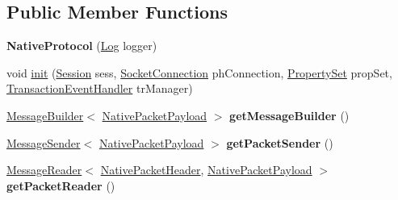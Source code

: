 \subsection*{Public Member Functions}
\begin{DoxyCompactItemize}
\item 
\mbox{\label{classcom_1_1mysql_1_1cj_1_1protocol_1_1a_1_1_native_protocol_ae0847faf5ec07f6c29d29f3f26728b90}} 
{\bfseries Native\+Protocol} (\mbox{\hyperlink{interfacecom_1_1mysql_1_1cj_1_1log_1_1_log}{Log}} logger)
\item 
void \mbox{\hyperlink{classcom_1_1mysql_1_1cj_1_1protocol_1_1a_1_1_native_protocol_a78d72401af5414a2271b9f1012b8a2f9}{init}} (\mbox{\hyperlink{interfacecom_1_1mysql_1_1cj_1_1_session}{Session}} sess, \mbox{\hyperlink{interfacecom_1_1mysql_1_1cj_1_1protocol_1_1_socket_connection}{Socket\+Connection}} ph\+Connection, \mbox{\hyperlink{interfacecom_1_1mysql_1_1cj_1_1conf_1_1_property_set}{Property\+Set}} prop\+Set, \mbox{\hyperlink{interfacecom_1_1mysql_1_1cj_1_1_transaction_event_handler}{Transaction\+Event\+Handler}} tr\+Manager)
\item 
\mbox{\label{classcom_1_1mysql_1_1cj_1_1protocol_1_1a_1_1_native_protocol_abded3c4e676d3558746c88ee5d206dda}} 
\mbox{\hyperlink{interfacecom_1_1mysql_1_1cj_1_1_message_builder}{Message\+Builder}}$<$ \mbox{\hyperlink{classcom_1_1mysql_1_1cj_1_1protocol_1_1a_1_1_native_packet_payload}{Native\+Packet\+Payload}} $>$ {\bfseries get\+Message\+Builder} ()
\item 
\mbox{\label{classcom_1_1mysql_1_1cj_1_1protocol_1_1a_1_1_native_protocol_aa2f4f22a35bd59ec16ca4cbf87e3fa6e}} 
\mbox{\hyperlink{interfacecom_1_1mysql_1_1cj_1_1protocol_1_1_message_sender}{Message\+Sender}}$<$ \mbox{\hyperlink{classcom_1_1mysql_1_1cj_1_1protocol_1_1a_1_1_native_packet_payload}{Native\+Packet\+Payload}} $>$ {\bfseries get\+Packet\+Sender} ()
\item 
\mbox{\label{classcom_1_1mysql_1_1cj_1_1protocol_1_1a_1_1_native_protocol_a04e273fff078fd0290c76ad9fd78744e}} 
\mbox{\hyperlink{interfacecom_1_1mysql_1_1cj_1_1protocol_1_1_message_reader}{Message\+Reader}}$<$ \mbox{\hyperlink{classcom_1_1mysql_1_1cj_1_1protocol_1_1a_1_1_native_packet_header}{Native\+Packet\+Header}}, \mbox{\hyperlink{classcom_1_1mysql_1_1cj_1_1protocol_1_1a_1_1_native_packet_payload}{Native\+Packet\+Payload}} $>$ {\bfseries get\+Packet\+Reader} ()

\end{DoxyCompactItemize}
